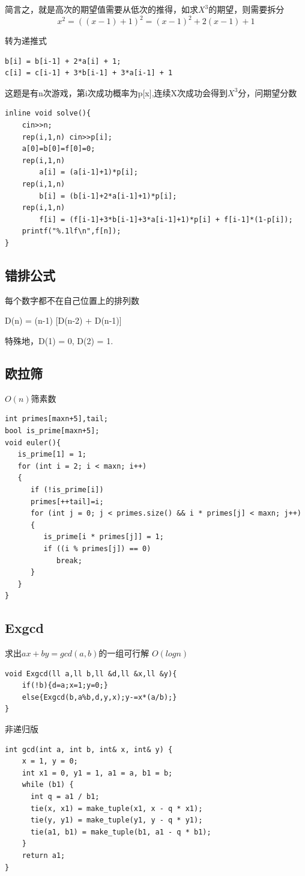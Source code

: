\documentclass[a4]{ctexart}
\begin{document}
简言之，就是高次的期望值需要从低次的推得，如求$X^3$的期望，则需要拆分
$$x^2 = ((x-1) + 1)^2 = (x-1)^2 + 2(x-1) + 1$$\par
转为递推式
\begin{lstlisting}
b[i] = b[i-1] + 2*a[i] + 1;
c[i] = c[i-1] + 3*b[i-1] + 3*a[i-1] + 1
\end{lstlisting}
\par
这题是有n次游戏，第i次成功概率为p[x],连续X次成功会得到$X^3$分，问期望分数\\
\begin{lstlisting}
inline void solve(){
    cin>>n;
    rep(i,1,n) cin>>p[i];
    a[0]=b[0]=f[0]=0;
    rep(i,1,n)
        a[i] = (a[i-1]+1)*p[i];
    rep(i,1,n)
        b[i] = (b[i-1]+2*a[i-1]+1)*p[i];
    rep(i,1,n)
        f[i] = (f[i-1]+3*b[i-1]+3*a[i-1]+1)*p[i] + f[i-1]*(1-p[i]);
    printf("%.1lf\n",f[n]);
}
\end{lstlisting}

\subsection{错排公式}
每个数字都不在自己位置上的排列数\par
D(n) = (n-1) [D(n-2) + D(n-1)]\par
特殊地，D(1) = 0, D(2) = 1.

\subsection{欧拉筛}
$O(n)$筛素数
\begin{lstlisting}
int primes[maxn+5],tail;
bool is_prime[maxn+5];
void euler(){
   is_prime[1] = 1;
   for (int i = 2; i < maxn; i++)
   {
      if (!is_prime[i])
      primes[++tail]=i;
      for (int j = 0; j < primes.size() && i * primes[j] < maxn; j++)
      {
         is_prime[i * primes[j]] = 1;
         if ((i % primes[j]) == 0)
            break;
      }
   }
}
\end{lstlisting}

\subsection{Exgcd}
求出$ax+by=gcd(a,b)$的一组可行解 $O(logn)$ 
\begin{lstlisting}
void Exgcd(ll a,ll b,ll &d,ll &x,ll &y){
	if(!b){d=a;x=1;y=0;}
	else{Exgcd(b,a%b,d,y,x);y-=x*(a/b);}
}
\end{lstlisting}
非递归版
\begin{lstlisting}
int gcd(int a, int b, int& x, int& y) {
    x = 1, y = 0;
    int x1 = 0, y1 = 1, a1 = a, b1 = b;
    while (b1) {
      int q = a1 / b1;
      tie(x, x1) = make_tuple(x1, x - q * x1);
      tie(y, y1) = make_tuple(y1, y - q * y1);
      tie(a1, b1) = make_tuple(b1, a1 - q * b1);
    }
    return a1;
}
\end{lstlisting}
\end{document}
